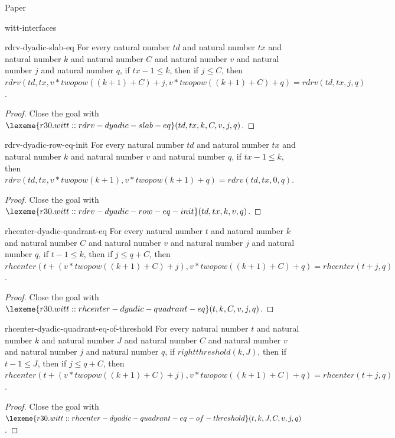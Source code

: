 \begin{lexlean}{Paper}
\begin{section}{witt-interfaces}
  \begin{theorem}{rdrv-dyadic-slab-eq}
  For every natural number \(td\) and natural number \(tx\) and natural number \(k\) and natural number \(C\) and natural number \(v\) and natural number \(j\) and natural number \(q\), if \(tx - 1 ≤ k\), then if \(j ≤ C\), then \(rdrv(td, tx, v * twopow((k + 1) + C) + j, v * twopow((k + 1) + C) + q) = rdrv(td, tx, j, q)\).
  \begin{proof}
  Close the goal with \(\lexeme{r30.witt::rdrv-dyadic-slab-eq}(td, tx, k, C, v, j, q)\).
  \end{proof}
  \end{theorem}

  \begin{theorem}{rdrv-dyadic-row-eq-init}
  For every natural number \(td\) and natural number \(tx\) and natural number \(k\) and natural number \(v\) and natural number \(q\), if \(tx - 1 ≤ k\), then \(rdrv(td, tx, v * twopow(k + 1), v * twopow(k + 1) + q) = rdrv(td, tx, 0, q)\).
  \begin{proof}
  Close the goal with \(\lexeme{r30.witt::rdrv-dyadic-row-eq-init}(td, tx, k, v, q)\).
  \end{proof}
  \end{theorem}

  \begin{theorem}{rhcenter-dyadic-quadrant-eq}
  For every natural number \(t\) and natural number \(k\) and natural number \(C\) and natural number \(v\) and natural number \(j\) and natural number \(q\), if \(t - 1 ≤ k\), then if \(j ≤ q + C\), then \(rhcenter(t + (v * twopow((k + 1) + C) + j), v * twopow((k + 1) + C) + q) = rhcenter(t + j, q)\).
  \begin{proof}
  Close the goal with \(\lexeme{r30.witt::rhcenter-dyadic-quadrant-eq}(t, k, C, v, j, q)\).
  \end{proof}
  \end{theorem}

  \begin{theorem}{rhcenter-dyadic-quadrant-eq-of-threshold}
  For every natural number \(t\) and natural number \(k\) and natural number \(J\) and natural number \(C\) and natural number \(v\) and natural number \(j\) and natural number \(q\), if \(rightthreshold(k, J)\), then if \(t - 1 ≤ J\), then if \(j ≤ q + C\), then \(rhcenter(t + (v * twopow((k + 1) + C) + j), v * twopow((k + 1) + C) + q) = rhcenter(t + j, q)\).
  \begin{proof}
  Close the goal with \(\lexeme{r30.witt::rhcenter-dyadic-quadrant-eq-of-threshold}(t, k, J, C, v, j, q)\).
  \end{proof}
  \end{theorem}


\end{section}
\end{lexlean}
